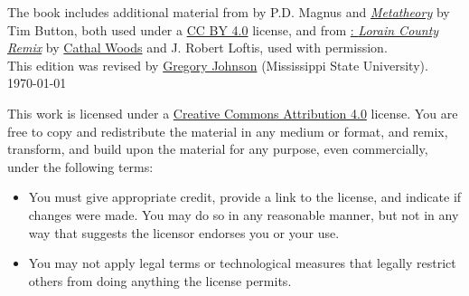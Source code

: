 \noindent The book includes additional material from \forallx{} by P.D. Magnus 
and \href{http://people.ds.cam.ac.uk/tecb2/metatheory.shtml}{\emph{Metatheory}} by Tim Button, 
both used under a \href{https://creativecommons.org/licenses/by/4.0/}{CC BY 4.0} license, 
and from \href{https://github.com/rob-helpy-chalk/openintroduction}{\forallx: \emph{Lorain County Remix}} by \href{https://sites.google.com/site/cathalwoods/}{Cathal Woods} and J. Robert Loftis, used with permission.\\[1ex]

\noindent This edition was revised by \href{http://loighic.net/}{Gregory Johnson} (Mississippi State University).\\[1ex]
\indent \today

\bigskip
\bigskip

\noindent \footnotesize This work is licensed under a \href{https://creativecommons.org/licenses/by/4.0/}{Creative Commons Attribution 4.0} license. 
You are free to copy and redistribute the material in any medium or format, and  remix, transform, and build upon the material for any purpose, even commercially, under the following terms:
\begin{itemize}
\item[] You must give appropriate credit, provide a link to the license, and indicate if changes were made. You may do so in any reasonable manner, but not in any way that suggests the licensor endorses you or your use.
\item[] You may not apply legal terms or technological measures that legally restrict others from doing anything the license permits.
\end{itemize}



\normalsize 
